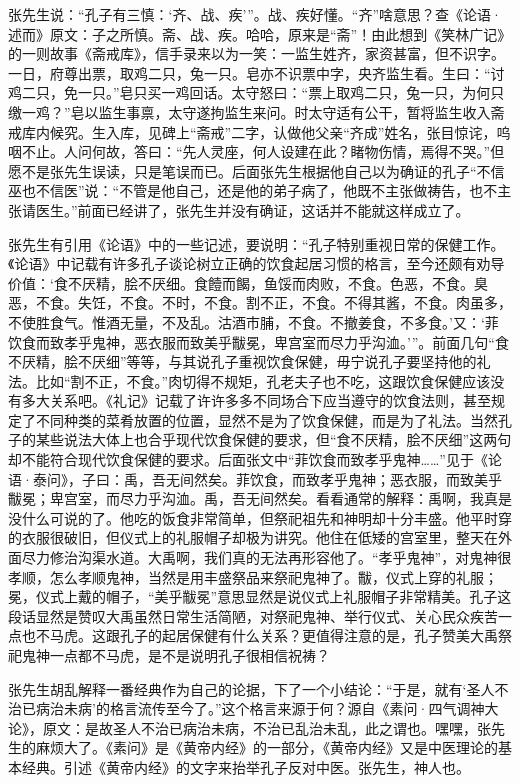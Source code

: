 张先生说：“孔子有三慎：‘齐、战、疾’”。战、疾好懂。“齐”啥意思？查《论语·述而》原文：子之所慎。斋、战、疾。哈哈，原来是“斋”！由此想到《笑林广记》的一则故事《斋戒库》，信手录来以为一笑：一监生姓齐，家资甚富，但不识字。一日，府尊出票，取鸡二只，兔一只。皂亦不识票中字，央齐监生看。生曰：“讨鸡二只，免一只。”皂只买一鸡回话。太守怒曰：“票上取鸡二只，兔一只，为何只缴一鸡？”皂以监生事禀，太守遂拘监生来问。时太守适有公干，暂将监生收入斋戒库内候究。生入库，见碑上“斋戒”二字，认做他父亲“齐成”姓名，张目惊诧，呜咽不止。人问何故，答曰：“先人灵座，何人设建在此？睹物伤情，焉得不哭。”但愿不是张先生误读，只是笔误而已。后面张先生根据他自己以为确证的孔子“不信巫也不信医”说：“不管是他自己，还是他的弟子病了，他既不主张做祷告，也不主张请医生。”前面已经讲了，张先生并没有确证，这话并不能就这样成立了。

张先生有引用《论语》中的一些记述，要说明：“孔子特别重视日常的保健工作。《论语》中记载有许多孔子谈论树立正确的饮食起居习惯的格言，至今还颇有劝导价值：‘食不厌精，脍不厌细。食饐而餲，鱼馁而肉败，不食。色恶，不食。臭恶，不食。失饪，不食。不时，不食。割不正，不食。不得其酱，不食。肉虽多，不使胜食气。惟酒无量，不及乱。沽酒市脯，不食。不撤姜食，不多食。’又：‘菲饮食而致孝乎鬼神，恶衣服而致美乎黻冕，卑宫室而尽力乎沟洫。’”。前面几句“食不厌精，脍不厌细”等等，与其说孔子重视饮食保健，毋宁说孔子要坚持他的礼法。比如“割不正，不食。”肉切得不规矩，孔老夫子也不吃，这跟饮食保健应该没有多大关系吧。《礼记》记载了许许多多不同场合下应当遵守的饮食法则，甚至规定了不同种类的菜肴放置的位置，显然不是为了饮食保健，而是为了礼法。当然孔子的某些说法大体上也合乎现代饮食保健的要求，但“食不厌精，脍不厌细”这两句却不能符合现代饮食保健的要求。后面张文中“菲饮食而致孝乎鬼神……”见于《论语·泰问》，子曰：禹，吾无间然矣。菲饮食，而致孝乎鬼神；恶衣服，而致美乎黻冕；卑宫室，而尽力乎沟洫。禹，吾无间然矣。看看通常的解释：禹啊，我真是没什么可说的了。他吃的饭食非常简单，但祭祀祖先和神明却十分丰盛。他平时穿的衣服很破旧，但仪式上的礼服帽子却极为讲究。他住在低矮的宫室里，整天在外面尽力修治沟渠水道。大禹啊，我们真的无法再形容他了。“孝乎鬼神”，对鬼神很孝顺，怎么孝顺鬼神，当然是用丰盛祭品来祭祀鬼神了。黻，仪式上穿的礼服；冕，仪式上戴的帽子，“美乎黻冕”意思显然是说仪式上礼服帽子非常精美。孔子这段话显然是赞叹大禹虽然日常生活简陋，对祭祀鬼神、举行仪式、关心民众疾苦一点也不马虎。这跟孔子的起居保健有什么关系？更值得注意的是，孔子赞美大禹祭祀鬼神一点都不马虎，是不是说明孔子很相信祝祷？

张先生胡乱解释一番经典作为自己的论据，下了一个小结论：“于是，就有‘圣人不治已病治未病’的格言流传至今了。”这个格言来源于何？源自《素问·四气调神大论》，原文：是故圣人不治已病治未病，不治已乱治未乱，此之谓也。嘿嘿，张先生的麻烦大了。《素问》是《黄帝内经》的一部分，《黄帝内经》又是中医理论的基本经典。引述《黄帝内经》的文字来抬举孔子反对中医。张先生，神人也。

